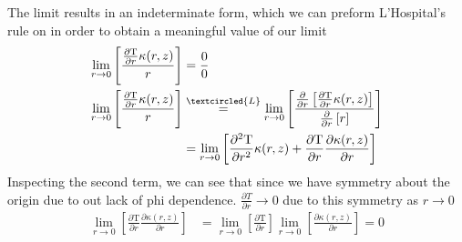 \documentclass[12pt]{article}
\begin{document}
      The limit results in an indeterminate form, which we can preform L'Hospital's rule on in order to obtain a meaningful value of our limit
      \begin{equation}
        \begin{aligned}
          \lim_{r\rightarrow 0} \left [ \frac{\frac{\partial\mathrm{T}}{\partial r}\kappa(r, z)}{r} \right ] &= \frac{0}{0} \\
          \lim_{r\rightarrow 0} \left [ \frac{\frac{\partial\mathrm{T}}{\partial r}\kappa(r, z)}{r} \right ] &\overset{\textcircled{L}}= \lim_{r\rightarrow 0} \left [ \frac{\frac{\partial}{\partial r} \left [\frac{\partial\mathrm{T}}{\partial r}\kappa(r, z)  \right ]}{\frac{\partial}{\partial r}\left [ r \right ]} \right ] \\
          &= \lim_{r\rightarrow 0} \left [ \frac{\partial^2\mathrm{T}}{\partial r^2}\kappa(r, z)  + \frac{\partial\mathrm{T}}{\partial r}\frac{\partial\kappa(r, z)}{\partial r}\right ] \\
        \end{aligned}
      \end{equation}
      Inspecting the second term, we can see that since we have symmetry about the origin due to out lack of phi dependence. $\frac{\partial T}{\partial r}\rightarrow0$ due to this symmetry as $r\rightarrow 0$
      \begin{equation}
        \begin{aligned}
          \lim_{r\rightarrow 0} \left [ \frac{\partial\mathrm{T}}{\partial r}\frac{\partial\kappa(r, z)}{\partial r} \right ] &= \lim_{r\rightarrow 0} \left [ \frac{\partial\mathrm{T}}{\partial r}\right ] \lim_{r\rightarrow 0}\left [  \frac{\partial\kappa(r, z)}{\partial r} \right ] = 0 \\
        \end{aligned}
      \end{equation}
      
\end{document}
